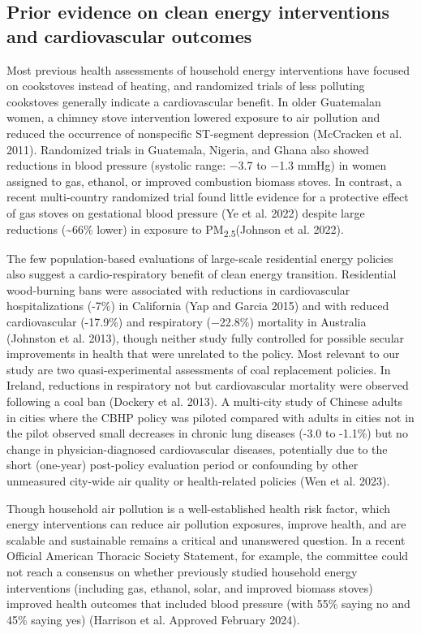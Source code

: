 \documentclass[
  letterpaper,
  DIV=11,
  numbers=noendperiod]{scrartcl}
\begin{document}
\hypertarget{prior-evidence-on-clean-energy-interventions-and-cardiovascular-outcomes}{%
\subsection{Prior evidence on clean energy interventions and
cardiovascular
outcomes}\label{prior-evidence-on-clean-energy-interventions-and-cardiovascular-outcomes}}

Most previous health assessments of household energy interventions have
focused on cookstoves instead of heating, and randomized trials of less
polluting cookstoves generally indicate a cardiovascular benefit. In
older Guatemalan women, a chimney stove intervention lowered exposure to
air pollution and reduced the occurrence of nonspecific ST-segment
depression (McCracken et al. 2011). Randomized trials in Guatemala,
Nigeria, and Ghana also showed reductions in blood pressure (systolic
range: −3.7 to −1.3 mmHg) in women assigned to gas, ethanol, or improved
combustion biomass stoves. In contrast, a recent multi-country
randomized trial found little evidence for a protective effect of gas
stoves on gestational blood pressure (Ye et al. 2022) despite large
reductions (\textasciitilde66\% lower) in exposure to
PM\textsubscript{2.5}(Johnson et al. 2022).

The few population-based evaluations of large-scale residential energy
policies also suggest a cardio-respiratory benefit of clean energy
transition. Residential wood-burning bans were associated with
reductions in cardiovascular hospitalizations (-7\%) in California (Yap
and Garcia 2015) and with reduced cardiovascular (-17.9\%) and
respiratory (−22.8\%) mortality in Australia (Johnston et al. 2013),
though neither study fully controlled for possible secular improvements
in health that were unrelated to the policy. Most relevant to our study
are two quasi-experimental assessments of coal replacement policies. In
Ireland, reductions in respiratory not but cardiovascular mortality were
observed following a coal ban (Dockery et al. 2013). A multi-city study
of Chinese adults in cities where the CBHP policy was piloted compared
with adults in cities not in the pilot observed small decreases in
chronic lung diseases (-3.0 to -1.1\%) but no change in
physician-diagnosed cardiovascular diseases, potentially due to the
short (one-year) post-policy evaluation period or confounding by other
unmeasured city-wide air quality or health-related policies (Wen et al.
2023).

Though household air pollution is a well-established health risk factor,
which energy interventions can reduce air pollution exposures, improve
health, and are scalable and sustainable remains a critical and
unanswered question. In a recent Official American Thoracic Society
Statement, for example, the committee could not reach a consensus on
whether previously studied household energy interventions (including
gas, ethanol, solar, and improved biomass stoves) improved health
outcomes that included blood pressure (with 55\% saying no and 45\%
saying yes) (Harrison et al. Approved February 2024).
\end{document}
